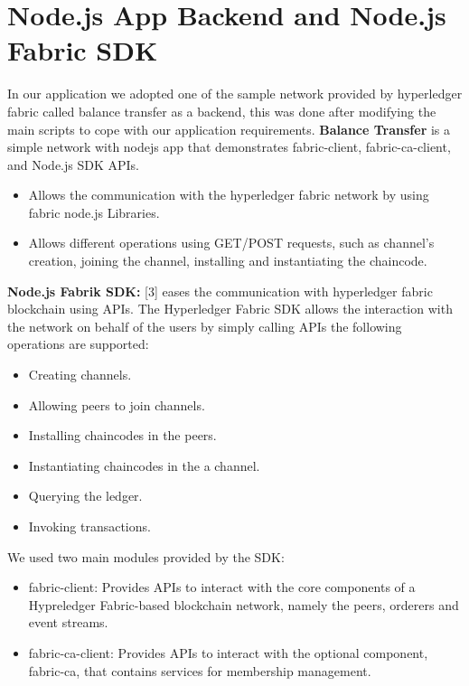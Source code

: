 \section{Node.js App Backend and Node.js Fabric SDK} 
In our application we adopted one of the sample network provided by hyperledger fabric called balance transfer as a backend, this was done after modifying the main scripts to cope with our application requirements. 
\textbf{Balance Transfer} is a simple network with nodejs app that demonstrates fabric-client, fabric-ca-client, and Node.js SDK APIs.
\begin{itemize}
  \item Allows the communication with the hyperledger fabric network by using fabric node.js Libraries.
  \item Allows different operations using GET/POST requests, such as channel’s creation, joining the channel, installing and instantiating the chaincode.  
\end{itemize} 
\bigskip
\textbf{Node.js Fabrik SDK:} [3] eases the communication with hyperledger fabric blockchain using APIs. 
The Hyperledger Fabric SDK allows the interaction with the network on behalf of the users by simply calling APIs the following operations are supported: \\  

\begin{itemize}
   \item Creating channels.
   \item Allowing peers to join channels. 
   \item Installing chaincodes in the peers.
   \item Instantiating chaincodes in the a channel. 
   \item Querying the ledger. 
   \item Invoking transactions. 
\end{itemize}  
\bigskip
We used two main modules provided by the SDK: 

 \begin{itemize}
  \item fabric-client: Provides APIs to interact with the core components of a Hypreledger Fabric-based blockchain network, namely the peers, orderers and event streams.
  \item fabric-ca-client: Provides APIs to interact with the optional component, fabric-ca, that contains services for membership management.
\end{itemize} 
\bigskip

